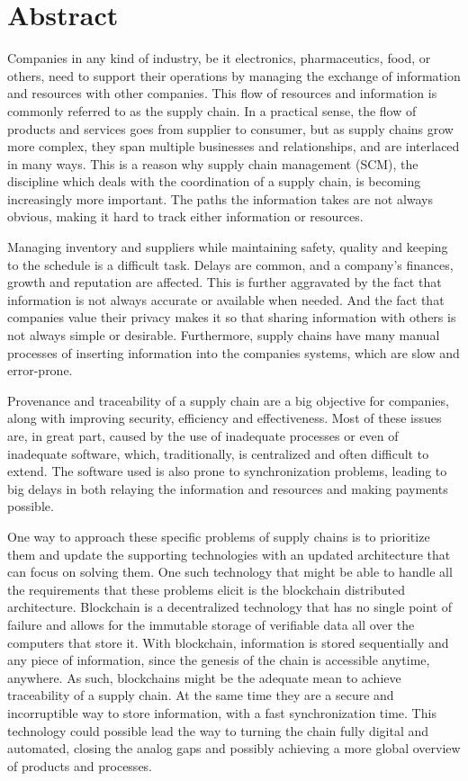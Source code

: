 \chapter{Abstract}
Companies in any kind of industry, be it electronics, pharmaceutics, food, or others, need to support their operations by managing the exchange of information and resources with other companies. This flow of resources and information is commonly referred to as the supply chain. In a practical sense, the flow of products and services goes from supplier to consumer, but as supply chains grow more complex, they span multiple businesses and relationships, and are interlaced in many ways. This is a reason why supply chain management (SCM), the discipline which deals with the coordination of a supply chain, is becoming increasingly more important. The paths the information takes are not always obvious, making it hard to track either information or resources.

Managing inventory and suppliers while maintaining safety, quality and keeping to the schedule is a difficult task. Delays are common, and a company’s finances, growth and reputation are affected. This is further aggravated by the fact that information is not always accurate or available when needed. And the fact that companies value their privacy makes it so that sharing information with others is not always simple or desirable. Furthermore, supply chains have many manual processes of inserting information into the companies systems, which are slow and error-prone.

Provenance and traceability of a supply chain are a big objective for companies, along with improving security, efficiency and effectiveness. Most of these issues are, in great part, caused by the use of inadequate processes or even of inadequate software, which, traditionally, is centralized and often difficult to extend. The software used is also prone to synchronization problems, leading to big delays in both relaying the information and resources and making payments possible. 

One way to approach these specific problems of supply chains is to prioritize them and update the supporting technologies with an updated architecture that can focus on solving them. One such technology that might be able to handle all the requirements that these problems elicit is the blockchain distributed architecture. Blockchain is a decentralized technology that has no single point of failure and allows for the immutable storage of verifiable data all over the computers that store it. With blockchain, information is stored sequentially and any piece of information, since the genesis of the chain is accessible anytime, anywhere. As such, blockchains might be the adequate mean to achieve traceability of a supply chain. At the same time they are a secure and incorruptible way to store information, with a fast synchronization time. This technology could possible lead the way to turning the chain fully digital and automated, closing the analog gaps and possibly achieving a more global overview of products and processes.

